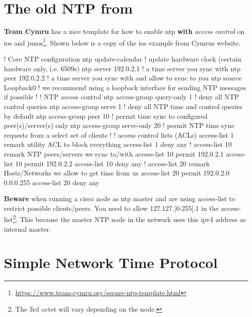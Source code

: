 
\section{The old NTP from }

\textbf{Team Cymru} has a nice template for how to enable \gls{ntp} \textbf{with} \textit{access control} on \gls{ios} and \gls{junos}\footnote{\url{https://www.team-cymru.org/secure-ntp-template.html}}. Shown below is a copy of the \gls{ios} example from Cymrus website.

\begin{cisco}
! Core NTP configuration
ntp update-calendar             ! update hardware clock (certain hardware only, i.e. 6509s)
ntp server 192.0.2.1            ! a time server you sync with
ntp peer   192.0.2.2            ! a time server you sync with and allow to sync to you
ntp source Loopback0            ! we recommend using a loopback interface for sending NTP messages if possible
!
! NTP access control
ntp access-group query-only 1   ! deny all NTP control queries
ntp access-group serve 1        ! deny all NTP time and control queries by default
ntp access-group peer 10        ! permit time sync to configured peer(s)/server(s) only
ntp access-group serve-only 20  ! permit NTP time sync requests from a select set of clients
!
! access control lists (ACLs)
access-list 1 remark utility ACL to block everything
access-list 1 deny any
!
access-list 10 remark NTP peers/servers we sync to/with
access-list 10 permit 192.0.2.1
access-list 10 permit 192.0.2.2
access-list 10 deny any
!
access-list 20 remark Hosts/Networks we allow to get time from us
access-list 20 permit 192.0.2.0 0.0.0.255
access-list 20 deny any
\end{cisco}

\textbf{Beware} when running a cisco node as \gls{ntp} master and are using access-list to restrict possible clients/peers. You need to allow 127.127.[0-255].1 in the access-list\footnote{The 3rd octet will vary depending on the node.}. This because the master NTP node in the network uses this \gls{ipv4} address as internal master.

\section[SNTP]{Simple Network Time Protocol}

